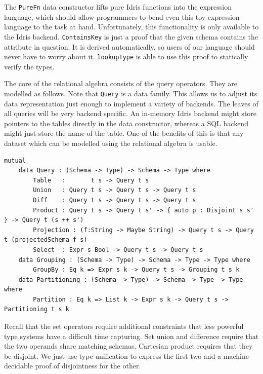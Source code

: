 \documentclass[12pt]{article}
\begin{document}
The \texttt{PureFn} data constructor lifts pure Idris functions into the expression language, which should allow programmers to bend even this toy expression language to the task at hand.
Unfortunately, this functionality is only available to the Idris backend.
\texttt{ContainsKey} is just a proof that the given schema contains the attribute in question.
It is derived automatically, so users of our language should never have to worry about it.
\texttt{lookupType} is able to use this proof to statically verify the types.


The core of the relational algebra consists of the query operators.
They are modelled as follows.
Note that \texttt{Query} is a data family.
This allows us to adjust its data representation just enough to implement a variety of backends.
The leaves of all queries will be very backend specific.
An in-memory Idris backend might store pointers to the tables directly in the data constructor, whereas a SQL backend might just store the name of the table.
One of the benefits of this is that any dataset which can be modelled using the relational algebra is usable.

\begin{lstlisting}
mutual
    data Query : (Schema -> Type) -> Schema -> Type where
        Table   :       t s -> Query t s
        Union   : Query t s -> Query t s -> Query t s
        Diff    : Query t s -> Query t s -> Query t s
        Product : Query t s -> Query t s' -> { auto p : Disjoint s s' } -> Query t (s ++ s')
        Projection : (f:String -> Maybe String) -> Query t s -> Query t (projectedSchema f s)
        Select  : Expr s Bool -> Query t s -> Query t s
    data Grouping : (Schema -> Type) -> Schema -> Type -> Type where
        GroupBy : Eq k => Expr s k -> Query t s -> Grouping t s k
    data Partitioning : (Schema -> Type) -> Schema -> Type -> Type where
        Partition : Eq k => List k -> Expr s k -> Query t s -> Partitioning t s k
\end{lstlisting}

Recall that the set operators require additional constraints that less powerful type systems have a difficult time capturing.
Set union and difference require that the two operands share matching schemas.
Cartesian product requires that they be disjoint.
We just use type unification to express the first two and a machine-decidable proof of disjointness for the other.

\end{document}
